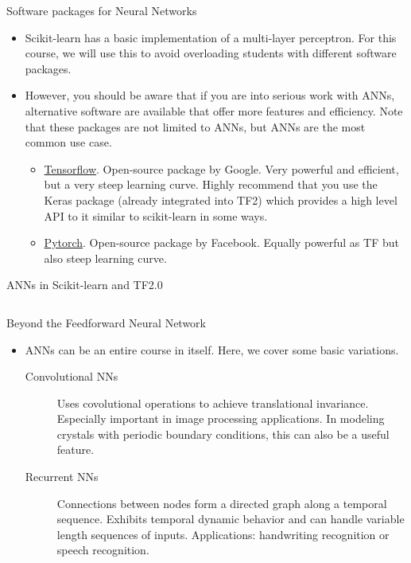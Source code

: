 \documentclass[aspectratio=169]{beamer}
\begin{document}
\begin{frame}{Software packages for Neural Networks}
    \begin{itemize}
        \item Scikit-learn has a basic implementation of a multi-layer perceptron. For this course, we will use this to avoid overloading students with different software packages.
        \item However, you should be aware that if you are into serious work with ANNs, alternative software are available that offer more features and efficiency. Note that these packages are not limited to ANNs, but ANNs are the most common use case.
        \begin{itemize}
            \item \href{https://www.tensorflow.org/}{Tensorflow}. Open-source package by Google. Very powerful and efficient, but a very steep learning curve. Highly recommend that you use the Keras package (already integrated into TF2) which provides a high level API to it similar to scikit-learn in some ways.
            \item \href{https://pytorch.org/}{Pytorch}. Open-source package by Facebook. Equally powerful as TF but also steep learning curve.
        \end{itemize}
    \end{itemize}
\end{frame}


\begin{frame}[fragile]{ANNs in Scikit-learn and TF2.0}
\inputminted{python}{example_sklearn_tf_neural_network.py}
\end{frame}


\begin{frame}{Beyond the Feedforward Neural Network}
    \begin{itemize}
        \item ANNs can be an entire course in itself. Here, we cover some basic variations.
        \begin{description}
        \item[Convolutional NNs] Uses covolutional operations to achieve translational invariance. Especially important in image processing applications. In modeling crystals with periodic boundary conditions, this can also be a useful feature.
        \item[Recurrent NNs] Connections between nodes form a directed graph along a temporal sequence. Exhibits temporal dynamic behavior and can handle variable length sequences of inputs. Applications: handwriting recognition or speech recognition.
        \end{description}

    \end{itemize}
\end{frame}
\end{document}
